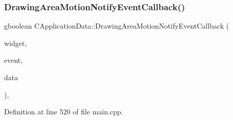 \subsubsection{\texorpdfstring{Drawing\+Area\+Motion\+Notify\+Event\+Callback()}{DrawingAreaMotionNotifyEventCallback()}}
{\footnotesize\ttfamily gboolean C\+Application\+Data\+::\+Drawing\+Area\+Motion\+Notify\+Event\+Callback (\begin{DoxyParamCaption}\item[{Gtk\+Widget $\ast$}]{widget,  }\item[{Gdk\+Event\+Motion $\ast$}]{event,  }\item[{gpointer}]{data }\end{DoxyParamCaption})\hspace{0.3cm}{\ttfamily [static]}, {\ttfamily [protected]}}



Definition at line 520 of file main.\+cpp.


